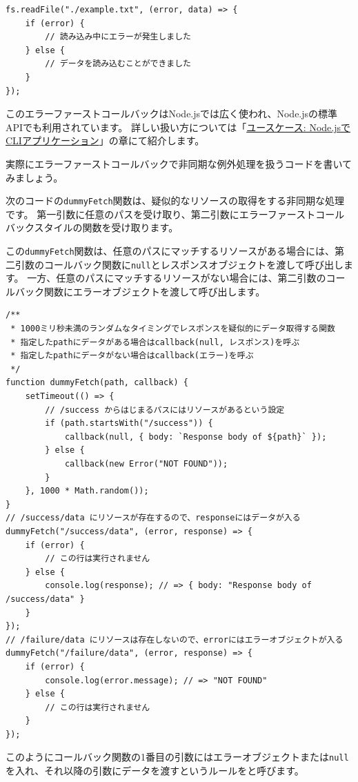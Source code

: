 \begin{lstlisting}
fs.readFile("./example.txt", (error, data) => {
    if (error) {
        // 読み込み中にエラーが発生しました
    } else {
        // データを読み込むことができました
    }
});
\end{lstlisting}

このエラーファーストコールバックはNode.jsでは広く使われ、Node.jsの標準APIでも利用されています。
詳しい扱い方については「\hyperlink{node-cli}{ユースケース:
Node.jsでCLIアプリケーション}」の章にて紹介します。

実際にエラーファーストコールバックで非同期な例外処理を扱うコードを書いてみましょう。

次のコードの\texttt{dummyFetch}関数は、疑似的なリソースの取得をする非同期な処理です。
第一引数に任意のパスを受け取り、第二引数にエラーファーストコールバックスタイルの関数を受け取ります。

この\texttt{dummyFetch}関数は、任意のパスにマッチするリソースがある場合には、第二引数のコールバック関数に\texttt{null}とレスポンスオブジェクトを渡して呼び出します。
一方、任意のパスにマッチするリソースがない場合には、第二引数のコールバック関数にエラーオブジェクトを渡して呼び出します。

\begin{lstlisting}
/**
 * 1000ミリ秒未満のランダムなタイミングでレスポンスを疑似的にデータ取得する関数
 * 指定したpathにデータがある場合はcallback(null, レスポンス)を呼ぶ
 * 指定したpathにデータがない場合はcallback(エラー)を呼ぶ
 */
function dummyFetch(path, callback) {
    setTimeout(() => {
        // /success からはじまるパスにはリソースがあるという設定
        if (path.startsWith("/success")) {
            callback(null, { body: `Response body of ${path}` });
        } else {
            callback(new Error("NOT FOUND"));
        }
    }, 1000 * Math.random());
}
// /success/data にリソースが存在するので、responseにはデータが入る
dummyFetch("/success/data", (error, response) => {
    if (error) {
        // この行は実行されません
    } else {
        console.log(response); // => { body: "Response body of /success/data" }
    }
});
// /failure/data にリソースは存在しないので、errorにはエラーオブジェクトが入る
dummyFetch("/failure/data", (error, response) => {
    if (error) {
        console.log(error.message); // => "NOT FOUND"
    } else {
        // この行は実行されません
    }
});
\end{lstlisting}

このようにコールバック関数の1番目の引数にはエラーオブジェクトまたは\texttt{null}を入れ、それ以降の引数にデータを渡すというルールを\textbf{}と呼びます。

